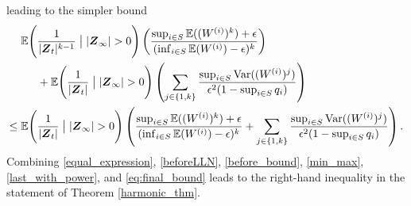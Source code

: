 \documentclass[preprint,3p,12pt]{elsarticle}
\theoremstyle{definition}
\newcommand{\Var}{\operatorname{Var}}
\begin{document}
leading to the simpler bound
\begin{align}
    \mathbb{E}\Bigg(&\frac{1}{|\boldsymbol{Z}_t|^{k-1}}\bigm||\boldsymbol{Z}_{\infty}| > 0\Bigg)\left(\frac{\sup_{i \in S}\mathbb{E}((W^{(i)})^k)+\epsilon}
    {(\inf_{i \in S}\mathbb{E}(W^{(i)})-\epsilon)^k}\right) \notag\\
    &+ \mathbb{E}\Bigg(\frac{1}{|\boldsymbol{Z}_t|}\bigm||\boldsymbol{Z}_{\infty}| > 0\Bigg) \left(
    \sum_{j \in \{1,k\}}\frac{\sup_{i \in S}{\Var((W^{(i)})^j)}}{ \epsilon^2(1 - \sup_{i \in S}q_i)}\right) \notag\\
    \le \mathbb{E}\Bigg(&\frac{1}{|\boldsymbol{Z}_t|}\bigm||\boldsymbol{Z}_{\infty}| > 0\Bigg)\left(\frac{\sup_{i \in S}\mathbb{E}((W^{(i)})^k)+\epsilon}
    {(\inf_{i \in S}\mathbb{E}(W^{(i)})-\epsilon)^k}
   + \sum_{j \in \{1,k\}}\frac{\sup_{i \in S}{\Var((W^{(i)})^j)}}{ \epsilon^2(1 - \sup_{i \in S}q_i)}\right). \label{eq:final_bound}
\end{align}
Combining \eqref{equal_expression}, \eqref{beforeLLN}, \eqref{before_bound}, \eqref{min_max}, \eqref{last_with_power}, and \eqref{eq:final_bound} leads to the right-hand inequality in the statement of Theorem \ref{harmonic_thm}.
\end{document}
